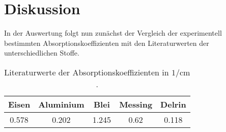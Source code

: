 \newpage
\section{Diskussion}

In der Auswertung folgt nun zunächst der Vergleich der experimentell bestimmten Absorptionskoeffizienten mit den 
Literaturwerten der unterschiedlichen Stoffe.

\begin{table}
    \centering
    \begin{tabular}{c c c c c}
    \toprule
    Eisen & Aluminium & Blei & Messing & Delrin\\
     \midrule 
    0.578 & 0.202 & 1.245 & 0.62 & 0.118\\
\bottomrule
\end{tabular}
\caption{Literaturwerte der Absorptionskoeffizienten in $\si{1\per\centi\metre}$ \cite{chemie} \cite{delrin}.}
\label{tab:lit}
\end{table}

